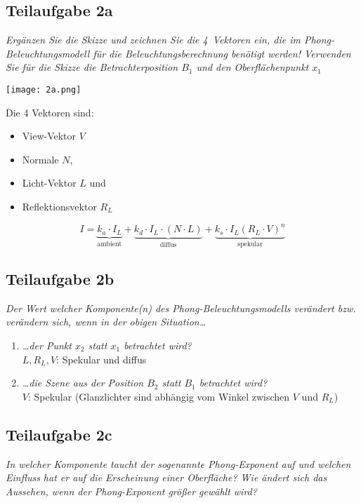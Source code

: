 \documentclass[a4paper]{scrartcl}
\begin{document}
\subsection*{Teilaufgabe 2a}
\textit{Ergänzen Sie die Skizze und zeichnen Sie die 4~Vektoren ein, die im
Phong-Beleuchtungsmodell für die Beleuchtungsberechnung benötigt werden!
Verwenden Sie für die Skizze die Betrachterposition $B_1$ und den
Oberflächenpunkt $x_1$}

\texttt{[image: 2a.png]}

Die 4 Vektoren sind:

\begin{itemize}
    \item View-Vektor $V$
    \item Normale $N$,
    \item Licht-Vektor $L$ und
    \item Reflektionsvektor $R_L$
\end{itemize}

\[I = \underbrace{k_a \cdot I_L}_{\text{ambient}} + \underbrace{k_d \cdot I_L \cdot (N \cdot L)}_{\text{diffus}} + \underbrace{k_s \cdot I_L (R_L \cdot V)^n}_{\text{spekular}}\]

\subsection*{Teilaufgabe 2b}
\textit{Der Wert welcher Komponente(n) des Phong-Beleuchtungsmodells verändert
bzw. verändern sich, wenn in der obigen Situation\dots}

\begin{enumerate}[label=(\roman*)]
    \item \textit{\dots der Punkt $x_2$ statt $x_1$ betrachtet wird?}\\
          $L, R_L, V$: Spekular und diffus
    \item \textit{\dots die Szene aus der Position $B_2$ statt $B_1$ betrachtet wird?}\\
          $V$: Spekular (Glanzlichter sind abhängig vom Winkel zwischen $V$ und $R_L$)
\end{enumerate}

\subsection*{Teilaufgabe 2c}
\textit{In welcher Komponente taucht der sogenannte Phong-Exponent auf und
welchen Einfluss hat er auf die Erscheinung einer Oberfläche? Wie ändert sich
das Aussehen, wenn der Phong-Exponent größer gewählt wird?}
\end{document}

